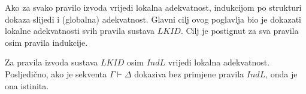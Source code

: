 Ako za svako pravilo izvoda vrijedi lokalna adekvatnost,
indukcijom po strukturi dokaza slijedi i (globalna) adekvatnost.
Glavni cilj ovog poglavlja bio je dokazati lokalne adekvatnosti svih pravila sustava \(\mathit{LKID}\).
Cilj je postignut za sva pravila osim pravila indukcije.

\begin{theorem}
  Za pravila izvoda sustava \(\mathit{LKID}\) osim \(\mathit{IndL}\) vrijedi lokalna adekvatnost.
  Posljedično, ako je sekventa \(\Gamma \vdash \Delta\) dokaziva bez primjene pravila \(\mathit{IndL}\), onda je ona istinita.
\end{theorem}


